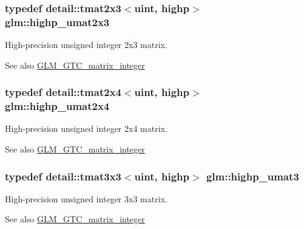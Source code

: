 \subsubsection[{\texorpdfstring{highp\+\_\+umat2x3}{highp_umat2x3}}]{\setlength{\rightskip}{0pt plus 5cm}typedef detail\+::tmat2x3$<$uint, highp$>$ {\bf glm\+::highp\+\_\+umat2x3}}\hypertarget{group__gtc__matrix__integer_ga309076d055b5511a7071ebb5f660ed83}{}\label{group__gtc__matrix__integer_ga309076d055b5511a7071ebb5f660ed83}
High-\/precision unsigned integer 2x3 matrix. \begin{DoxySeeAlso}{See also}
\hyperlink{group__gtc__matrix__integer}{G\+L\+M\+\_\+\+G\+T\+C\+\_\+matrix\+\_\+integer} 
\end{DoxySeeAlso}
\subsubsection[{\texorpdfstring{highp\+\_\+umat2x4}{highp_umat2x4}}]{\setlength{\rightskip}{0pt plus 5cm}typedef detail\+::tmat2x4$<$uint, highp$>$ {\bf glm\+::highp\+\_\+umat2x4}}\hypertarget{group__gtc__matrix__integer_gabe8572c228aecc0bfa7ba92415b1c651}{}\label{group__gtc__matrix__integer_gabe8572c228aecc0bfa7ba92415b1c651}
High-\/precision unsigned integer 2x4 matrix. \begin{DoxySeeAlso}{See also}
\hyperlink{group__gtc__matrix__integer}{G\+L\+M\+\_\+\+G\+T\+C\+\_\+matrix\+\_\+integer} 
\end{DoxySeeAlso}
\subsubsection[{\texorpdfstring{highp\+\_\+umat3}{highp_umat3}}]{\setlength{\rightskip}{0pt plus 5cm}typedef detail\+::tmat3x3$<$uint, highp$>$ {\bf glm\+::highp\+\_\+umat3}}\hypertarget{group__gtc__matrix__integer_ga2a271939d0123103f088e325e5123385}{}\label{group__gtc__matrix__integer_ga2a271939d0123103f088e325e5123385}
High-\/precision unsigned integer 3x3 matrix. \begin{DoxySeeAlso}{See also}
\hyperlink{group__gtc__matrix__integer}{G\+L\+M\+\_\+\+G\+T\+C\+\_\+matrix\+\_\+integer} 
\end{DoxySeeAlso}
